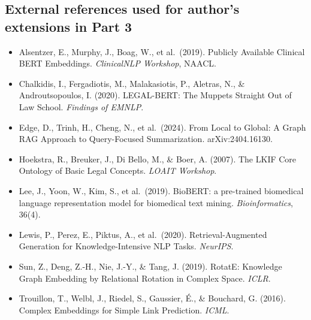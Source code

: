 \documentclass[11pt, a4paper]{article}
\begin{document}
\subsection*{External references used for author's extensions in Part 3}
\begin{itemize}[itemsep=0.1em, leftmargin=*]
  \item Alsentzer, E., Murphy, J., Boag, W., et al.\ (2019). Publicly Available Clinical BERT Embeddings. \emph{ClinicalNLP Workshop}, NAACL.
  \item Chalkidis, I., Fergadiotis, M., Malakasiotis, P., Aletras, N., \& Androutsopoulos, I. (2020). LEGAL-BERT: The Muppets Straight Out of Law School. \emph{Findings of EMNLP}.
  \item Edge, D., Trinh, H., Cheng, N., et al.\ (2024). From Local to Global: A Graph RAG Approach to Query-Focused Summarization. arXiv:2404.16130.
  \item Hoekstra, R., Breuker, J., Di Bello, M., \& Boer, A. (2007). The LKIF Core Ontology of Basic Legal Concepts. \emph{LOAIT Workshop}.
  \item Lee, J., Yoon, W., Kim, S., et al.\ (2019). BioBERT: a pre-trained biomedical language representation model for biomedical text mining. \emph{Bioinformatics}, 36(4).
  \item Lewis, P., Perez, E., Piktus, A., et al.\ (2020). Retrieval-Augmented Generation for Knowledge-Intensive NLP Tasks. \emph{NeurIPS}.
  \item Sun, Z., Deng, Z.-H., Nie, J.-Y., \& Tang, J. (2019). RotatE: Knowledge Graph Embedding by Relational Rotation in Complex Space. \emph{ICLR}.
  \item Trouillon, T., Welbl, J., Riedel, S., Gaussier, É., \& Bouchard, G. (2016). Complex Embeddings for Simple Link Prediction. \emph{ICML}.
\end{itemize}
\end{document}
